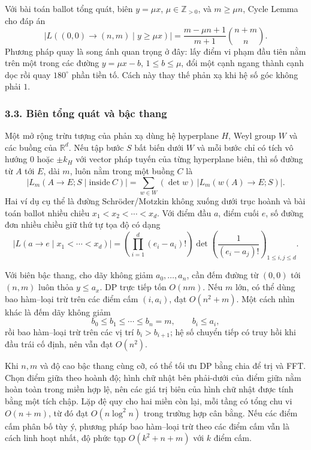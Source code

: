 \documentclass[11pt]{article}
\begin{document}
Với bài toán ballot tổng quát, biên \(y=\mu x\), \(\mu\in\mathbb Z_{>0}\), và
\(m\ge \mu n\), Cycle Lemma cho đáp án
\[
  |L((0,0)\to(n,m)\mid y\ge \mu x)|
  =
  \frac{m-\mu n+1}{m+1}\binom{n+m}{n}.
\]
Phương pháp quay là song ánh quan trọng ở đây: lấy điểm vi phạm đầu tiên
nằm trên một trong các đường \(y=\mu x-b\), \(1\le b\le \mu\), đổi một cạnh
ngang thành cạnh dọc rồi quay \(180^\circ\) phần tiền tố. Cách này thay thế
phản xạ khi hệ số góc không phải \(1\).


\subsubsection*{3.3. Biên tổng quát và bậc thang}

Một mở rộng trừu tượng của phản xạ dùng hệ hyperplane \(H\), Weyl group \(W\)
và các buồng của \(\mathbb R^d\). Nếu tập bước \(S\) bất biến dưới \(W\) và
mỗi bước chỉ có tích vô hướng \(0\) hoặc \(\pm k_H\) với vector pháp tuyến của
từng hyperplane biên, thì số đường từ \(A\) tới \(E\), dài \(m\), luôn nằm
trong một buồng \(C\) là
\[
  |L_m(A\to E;S\mid \mathrm{inside}\ C)|
  =
  \sum_{w\in W}(\det w)\,|L_m(w(A)\to E;S)|.
\]
Hai ví dụ cụ thể là đường Schröder/Motzkin không xuống dưới trục hoành và bài
toán ballot nhiều chiều \(x_1<x_2<\cdots<x_d\). Với điểm đầu \(a\), điểm cuối
\(e\), số đường đơn nhiều chiều giữ thứ tự tọa độ có dạng
\[
  |L(a\to e\mid x_1<\cdots<x_d)|
  =
  \left(\prod_{i=1}^d (e_i-a_i)!\right)
  \det\left(\frac1{(e_i-a_j)!}\right)_{1\le i,j\le d}.
\]

Với biên bậc thang, cho dãy không giảm \(a_0,\ldots,a_n\), cần đếm đường từ
\((0,0)\) tới \((n,m)\) luôn thỏa \(y\le a_x\). DP trực tiếp tốn \(O(nm)\).
Nếu \(m\) lớn, có thể dùng bao hàm--loại trừ trên các điểm cấm
\((i,a_i)\), đạt \(O(n^2+m)\). Một cách nhìn khác là đếm dãy không giảm
\[
  b_0\le b_1\le\cdots\le b_n=m,\qquad b_i\le a_i,
\]
rồi bao hàm--loại trừ trên các vị trí \(b_i>b_{i+1}\); hệ số chuyển tiếp có
truy hồi khi đầu trái cố định, nên vẫn đạt \(O(n^2)\).

Khi \(n,m\) và độ cao bậc thang cùng cỡ, có thể tối ưu DP bằng chia để trị và
FFT. Chọn điểm giữa theo hoành độ; hình chữ nhật bên phải-dưới của điểm giữa
nằm hoàn toàn trong miền hợp lệ, nên các giá trị biên của hình chữ nhật được
tính bằng một tích chập. Lặp đệ quy cho hai miền còn lại, mỗi tầng có tổng chu
vi \(O(n+m)\), từ đó đạt \(O(n\log^2 n)\) trong trường hợp cân bằng. Nếu các
điểm cấm phân bố tùy ý, phương pháp bao hàm--loại trừ theo các điểm cấm vẫn là
cách linh hoạt nhất, độ phức tạp \(O(k^2+n+m)\) với \(k\) điểm cấm.
\end{document}
